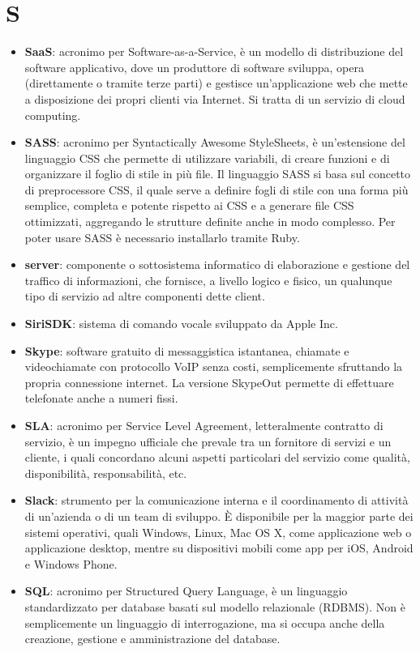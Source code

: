 \section{S}
\begin{itemize}
	\item \textbf{SaaS}: acronimo per Software-as-a-Service, è un modello di distribuzione del software applicativo, dove un produttore di software sviluppa, opera (direttamente o tramite terze parti) e gestisce un'applicazione web che mette a disposizione dei propri clienti via Internet. Si tratta di un servizio di cloud computing.
	\item \textbf{SASS}: acronimo per Syntactically Awesome StyleSheets, è un'estensione del linguaggio CSS che permette di utilizzare variabili, di creare funzioni e di organizzare il foglio di stile in più file. Il linguaggio SASS si basa sul concetto di preprocessore CSS, il quale serve a definire fogli di stile con una forma più semplice, completa e potente rispetto ai CSS e a generare file CSS ottimizzati, aggregando le strutture definite anche in modo complesso. Per poter usare SASS è necessario installarlo tramite Ruby.
	\item \textbf{server}: componente o sottosistema informatico di elaborazione e gestione del traffico di informazioni, che fornisce, a livello logico e fisico, un qualunque tipo di servizio ad altre componenti dette client.
	\item \textbf{SiriSDK}: sistema di comando vocale sviluppato da Apple Inc.
	\item \textbf{Skype}: software gratuito di messaggistica istantanea, chiamate e videochiamate con protocollo VoIP senza costi, semplicemente sfruttando la propria connessione internet. La versione SkypeOut permette di effettuare telefonate anche a numeri fissi.
	\item \textbf{SLA}: acronimo per Service Level Agreement, letteralmente contratto di servizio, è un impegno ufficiale che prevale tra un fornitore di servizi e un cliente, i quali concordano alcuni aspetti particolari del servizio come qualità, disponibilità, responsabilità, etc.
	\item \textbf{Slack}: strumento per la comunicazione interna e il coordinamento di attività di un'azienda o di un team di sviluppo. \MakeUppercase{è} disponibile per la maggior parte dei sistemi operativi, quali Windows, Linux, Mac OS X, come applicazione web o applicazione desktop, mentre su dispositivi mobili come app per iOS, Android e Windows Phone.
	\item \textbf{SQL}: acronimo per Structured Query Language, è un linguaggio standardizzato per database basati sul modello relazionale (RDBMS). Non è semplicemente un linguaggio di interrogazione, ma si occupa anche della creazione, gestione e amministrazione del database.

\end{itemize}

